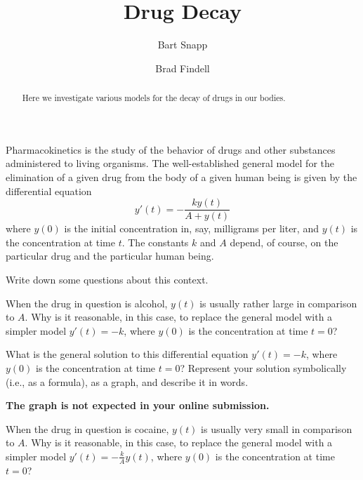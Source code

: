 \documentclass{ximera}
\title{Drug Decay}
\author{Bart Snapp \and Brad Findell}
\begin{document}
\begin{abstract}
Here we investigate various models for the decay of drugs in our bodies.  
\end{abstract}
\maketitle

Pharmacokinetics is the study of the behavior of drugs and other substances administered to living organisms.  
The well-established general model for 
the elimination of a given drug from the body of a given human being is given by the differential equation 
$$y'(t)=-\frac{ky(t)}{A+y(t)}$$
where $y(0)$ is the initial concentration in, say, milligrams per liter, and $y(t)$ is the concentration at time $t$.  The constants $k$ and $A$ depend, of course, on the particular drug and the particular human being. 

\begin{question}
Write down some questions about this context.       
\begin{freeResponse}
\end{freeResponse}
\end{question}


\begin{question}
When the drug in question is alcohol, $y(t)$ is usually rather large in comparison to $A$.   Why is it reasonable, in this case, to replace the general model with a simpler model $y'(t)=-k$, where $y(0)$ is the concentration at time $t=0$?  
\begin{freeResponse}
\end{freeResponse}
\end{question}


\begin{question}
What is the general solution to this differential equation $y'(t)=-k$, where $y(0)$ is the concentration at time $t=0$?   Represent your solution symbolically (i.e., as a formula), as a graph, and describe it in words.  
\begin{prompt}
\textbf{The graph is not expected in your online submission.}
\end{prompt}
\begin{freeResponse}
\end{freeResponse}
\end{question}


\begin{question}
When the drug in question is cocaine, $y(t)$ is usually very small in comparison to $A$.   Why is it reasonable, in this case, to replace the general model with a simpler model $y'(t)=-\frac{k}{A}y(t)$, where $y(0)$ is the concentration at time $t=0$?  
\begin{freeResponse}
\end{freeResponse}
\end{question}
\end{document}
